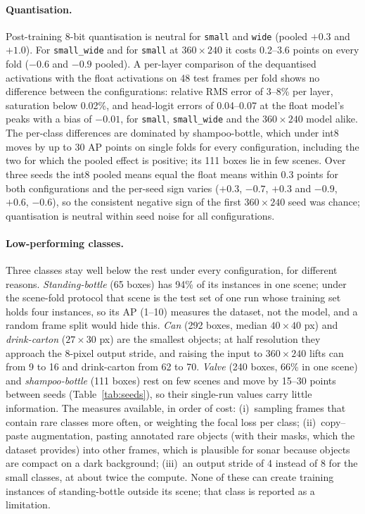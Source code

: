 \documentclass[11pt,a4paper]{article}
\newcommand{\cfg}[1]{\texttt{#1}}
\begin{document}
\paragraph{Quantisation.} Post-training 8-bit quantisation is neutral for
\cfg{small} and \cfg{wide} (pooled $+0.3$ and $+1.0$). For \cfg{small\_wide}
and for \cfg{small} at $360 \times 240$ it costs 0.2--3.6 points on every fold
($-0.6$ and $-0.9$ pooled). A per-layer comparison of the dequantised
activations with the float activations on 48 test frames per fold shows no
difference between the configurations: relative RMS error of 3--8\% per
layer, saturation below 0.02\%, and head-logit errors of 0.04--0.07 at the
float model's peaks with a bias of $-0.01$, for \cfg{small}, \cfg{small\_wide}
and the $360 \times 240$ model alike. The per-class differences are dominated
by shampoo-bottle, which under int8 moves by up to 30 AP points on single
folds for every configuration, including the two for which the pooled
effect is positive; its 111 boxes lie in few scenes. Over three seeds the int8 pooled means equal the float means within 0.3
points for both configurations and the per-seed sign varies ($+0.3$,
$-0.7$, $+0.3$ and $-0.9$, $+0.6$, $-0.6$), so the consistent negative sign
of the first $360 \times 240$ seed was chance; quantisation is neutral
within seed noise for all configurations.

\paragraph{Low-performing classes.} Three classes stay well below the rest
under every configuration, for different reasons. \emph{Standing-bottle}
(65 boxes) has 94\% of its instances in one scene; under the scene-fold
protocol that scene is the test set of one run whose training set holds four
instances, so its AP (1--10) measures the dataset, not the model, and a
random frame split would hide this. \emph{Can} (292 boxes, median
$40 \times 40$ px) and \emph{drink-carton} ($27 \times 30$ px) are the
smallest objects; at half resolution they approach the 8-pixel output stride,
and raising the input to $360 \times 240$ lifts can from 9 to 16 and
drink-carton from 62 to 70. \emph{Valve} (240 boxes, 66\% in one scene) and
\emph{shampoo-bottle} (111 boxes) rest on few scenes and move by 15--30
points between seeds (Table~\ref{tab:seeds}), so their single-run values
carry little information. The measures available, in order of cost:
(i)~sampling frames that contain rare classes more often, or weighting the
focal loss per class; (ii)~copy--paste augmentation, pasting annotated
rare objects (with their masks, which the dataset provides) into other
frames, which is plausible for sonar because objects are compact on a dark
background; (iii)~an output stride of 4 instead of 8 for the small classes,
at about twice the compute. None of these can create training instances of
standing-bottle outside its scene; that class is reported as a limitation.
\end{document}
